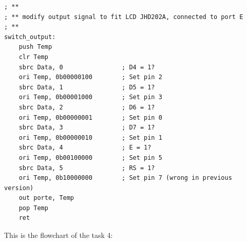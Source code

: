 \documentclass[a4paper,12pt]{article}
\begin{document}
\begin{lstlisting}
; **
; ** modify output signal to fit LCD JHD202A, connected to port E
; **
switch_output:
	push Temp
	clr Temp
	sbrc Data, 0				; D4 = 1?
	ori Temp, 0b00000100		; Set pin 2 
	sbrc Data, 1				; D5 = 1?
	ori Temp, 0b00001000		; Set pin 3 
	sbrc Data, 2				; D6 = 1?
	ori Temp, 0b00000001		; Set pin 0 
	sbrc Data, 3				; D7 = 1?
	ori Temp, 0b00000010		; Set pin 1 
	sbrc Data, 4				; E = 1?
	ori Temp, 0b00100000		; Set pin 5 
	sbrc Data, 5				; RS = 1?
	ori Temp, 0b10000000		; Set pin 7 (wrong in previous version)
	out porte, Temp
	pop Temp
	ret
\end{lstlisting}

This is the flowchart of the task 4:
\begin{center}
\end{center}


\end{document}
